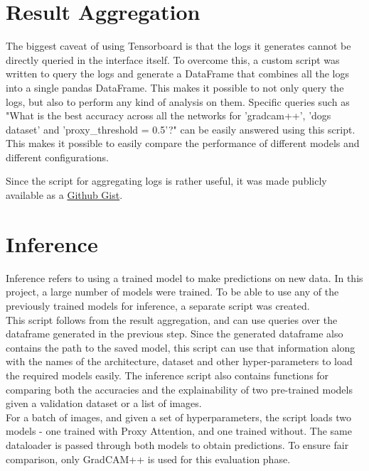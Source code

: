 \section{Result Aggregation} \label{sec:result_aggregation}
The biggest caveat of using Tensorboard is that the logs it generates cannot be directly queried in the interface itself. To overcome this, a custom script was written to query the logs and generate a DataFrame that combines all the logs into a single pandas DataFrame. This makes it possible to not only query the logs, but also to perform any kind of analysis on them. Specific queries such as "What is the best accuracy across all the networks for 'gradcam++', 'dogs dataset' and 'proxy\_threshold = 0.5'?" can be easily answered using this script. This makes it possible to easily compare the performance of different models and different configurations. 

Since the script for aggregating logs is rather useful, it was made publicly available as a \href{https://gist.github.com/SubhadityaMukherjee/58cbdf324812175233e91993b720e0bc}{Github Gist}.

\section{Inference}
Inference refers to using a trained model to make predictions on new data. In this project, a large number of models were trained. To be able to use any of the previously trained models for inference, a separate script was created.\\
This script follows from the result aggregation, and can use queries over the dataframe generated in the previous step. Since the generated dataframe also contains the path to the saved model, this script can use that information along with the names of the architecture, dataset and other hyper-parameters to load the required models easily. 
The inference script also contains functions for comparing both the accuracies and the explainability of two pre-trained models given a validation dataset or a list of images.\\
For a batch of images, and given a set of hyperparameters, the script loads two models - one trained with Proxy Attention, and one trained without. The same dataloader is passed through both models to obtain predictions. To ensure fair comparison, only GradCAM++ is used for this evaluation phase. 